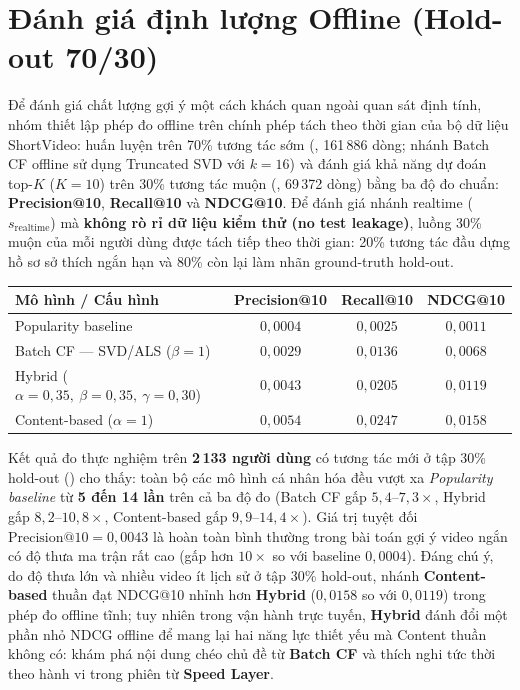 
\section{Đánh giá định lượng Offline (Hold-out 70/30)}

Để đánh giá chất lượng gợi ý một cách khách quan ngoài quan sát định tính, nhóm thiết lập phép đo offline trên chính phép tách theo thời gian của bộ dữ liệu ShortVideo: huấn luyện trên 70\% tương tác sớm (, 161\,886 dòng; nhánh Batch CF offline sử dụng Truncated SVD với $k=16$) và đánh giá khả năng dự đoán top-$K$ ($K = 10$) trên 30\% tương tác muộn (, 69\,372 dòng) bằng ba độ đo chuẩn: \textbf{Precision@10}, \textbf{Recall@10} và \textbf{NDCG@10}. Để đánh giá nhánh realtime ($s_{\mathrm{realtime}}$) mà \textbf{không rò rỉ dữ liệu kiểm thử (no test leakage)}, luồng 30\% muộn của mỗi người dùng được tách tiếp theo thời gian: 20\% tương tác đầu dựng hồ sơ sở thích ngắn hạn và 80\% còn lại làm nhãn ground-truth hold-out.

\begin{center}
{\small\SingleSpacing
\renewcommand{\arraystretch}{1.12}
\begin{tabularx}{\textwidth}{@{}>{\raggedright\arraybackslash}Xccc@{}}
\toprule
Mô hình / Cấu hình & Precision@10 & Recall@10 & NDCG@10 \\
\midrule
Popularity baseline & $0{,}0004$ & $0{,}0025$ & $0{,}0011$ \\
Batch CF --- SVD/ALS ($\beta=1$) & $0{,}0029$ & $0{,}0136$ & $0{,}0068$ \\
Hybrid ($\alpha=0{,}35,\ \beta=0{,}35,\ \gamma=0{,}30$) & $0{,}0043$ & $0{,}0205$ & $0{,}0119$ \\
Content-based ($\alpha=1$) & $0{,}0054$ & $0{,}0247$ & $0{,}0158$ \\
\bottomrule
\end{tabularx}}
\end{center}

Kết quả đo thực nghiệm trên \textbf{2\,133 người dùng} có tương tác mới ở tập 30\% hold-out () cho thấy: toàn bộ các mô hình cá nhân hóa đều vượt xa \textit{Popularity baseline} từ \textbf{5 đến 14 lần} trên cả ba độ đo (Batch CF gấp $5{,}4$--$7{,}3\times$, Hybrid gấp $8{,}2$--$10{,}8\times$, Content-based gấp $9{,}9$--$14{,}4\times$). Giá trị tuyệt đối $\text{Precision@10} = 0{,}0043$ là hoàn toàn bình thường trong bài toán gợi ý video ngắn có độ thưa ma trận rất cao (gấp hơn $10\times$ so với baseline $0{,}0004$). Đáng chú ý, do độ thưa lớn và nhiều video ít lịch sử ở tập 30\% hold-out, nhánh \textbf{Content-based} thuần đạt NDCG@10 nhỉnh hơn \textbf{Hybrid} ($0{,}0158$ so với $0{,}0119$) trong phép đo offline tĩnh; tuy nhiên trong vận hành trực tuyến, \textbf{Hybrid} đánh đổi một phần nhỏ NDCG offline để mang lại hai năng lực thiết yếu mà Content thuần không có: khám phá nội dung chéo chủ đề từ \textbf{Batch CF} và thích nghi tức thời theo hành vi trong phiên từ \textbf{Speed Layer}.

